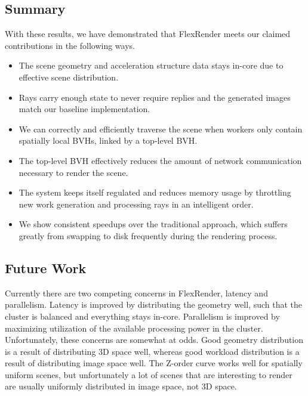 \documentclass[a4paper,twoside]{article}
\begin{document}
\subsection{Summary}
\label{resultssummary}

With these results, we have demonstrated that FlexRender meets our claimed
contributions in the following ways.

\begin{itemize}
    \item The scene geometry and acceleration structure data stays in-core due
        to effective scene distribution.
    \item Rays carry enough state to never require replies and the generated
        images match our baseline implementation.
    \item We can correctly and efficiently traverse the scene when workers
        only contain spatially local BVHs, linked by a top-level BVH.
    \item The top-level BVH effectively reduces the amount of network
        communication necessary to render the scene.
    \item The system keeps itself regulated and reduces memory usage by
        throttling new work generation and processing rays in an intelligent
        order.
    \item We show consistent speedups over the traditional approach, which
        suffers greatly from swapping to disk frequently during the rendering
        process.
\end{itemize}

\subsection{Future Work}
\label{futurework}

Currently there are two competing concerns in FlexRender, latency and
parallelism. Latency is improved by distributing the geometry well, such that
the cluster is balanced and everything stays in-core. Parallelism is improved
by maximizing utilization of the available processing power in the cluster.
Unfortunately, these concerns are somewhat at odds. Good geometry distribution
is a result of distributing 3D space well, whereas good workload distribution
is a result of distributing image space well. The Z-order curve works well
for spatially uniform scenes, but unfortunately a lot of scenes that are
interesting to render are usually uniformly distributed in image space, not
3D space. 
\end{document}
